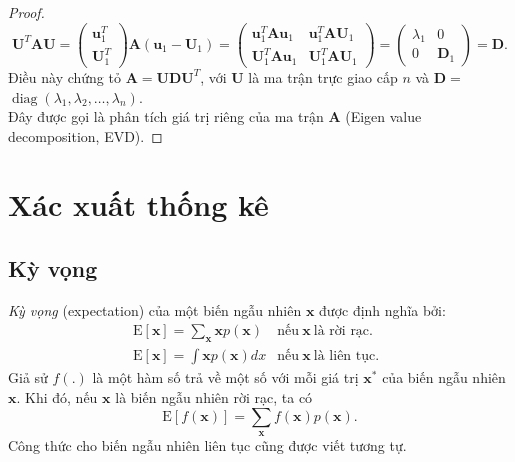 \documentclass[14pt,oneside,a4paper]{report}
\numberwithin{equation}{section}
\begin{document}
\begin{proof}
	$$
	\mathbf{U}^{T} \mathbf{A} \mathbf{U}=\left(\begin{array}{c}
		\mathbf{u}_{1}^{T} \\
		\mathbf{U}_{1}^{T}
	\end{array}\right) \mathbf{A}\left(\mathbf{u}_{1}-\mathbf{U}_{1}\right)=\left(\begin{array}{cc}
		\mathbf{u}_{1}^{T} \mathbf{A} \mathbf{u}_{1} & \mathbf{u}_{1}^{T} \mathbf{A} \mathbf{U}_{1} \\
		\mathbf{U}_{1}^{T} \mathbf{A} \mathbf{u}_{1} & \mathbf{U}_{1}^{T} \mathbf{A} \mathbf{U}_{1}
	\end{array}\right)=\left(\begin{array}{cc}
		\lambda_{1} & 0 \\
		0 & \mathbf{D}_{1}
	\end{array}\right)=\mathbf{D} .
	$$
	Điều này chứng tỏ $\mathbf{A}=\mathbf{U D U}^{T}$, với $\mathbf{U}$ là ma trận trực giao cấp $n$ và $\mathbf{D}=$ $\operatorname{diag}\left(\lambda_{1}, \lambda_{2}, \ldots, \lambda_{n}\right).$\\
	Đây được gọi là phân tích giá trị riêng của ma trận $\mathbf{A}$ (Eigen value decomposition, EVD). 
\end{proof}
\section{Xác xuất thống kê}
\subsection{Kỳ vọng}
\label{sub:expectaion_covariance}
\textit{Kỳ vọng} (expectation) của một biến ngẫu nhiên $\mathbf{x}$ được định nghĩa bởi:
\begin{eqnarray}
	\label{eqn:30_21}
	\text{E}[\mathbf{x}] = \sum_ \mathbf{x} \mathbf{x} p(\mathbf{x})  & \text{nếu}~\mathbf{ x} ~ \text{là rời rạc.} \quad
	\\
	\label{eqn:30_22}
	\text{E}[\mathbf{x}] = \int \mathbf{x} p(\mathbf{x}) dx  & \text{nếu}~ \mathbf{x} ~ \text{là liên tục.}
\end{eqnarray}
Giả sử $f(.)$ là một hàm số trả về một số với mỗi giá trị $\mathbf{x^*}$ của biến ngẫu
nhiên $\mathbf{x}$. Khi đó, nếu $\mathbf{x}$ là biến ngẫu nhiên rời rạc, ta có
\begin{equation}
\label{eqn:30_23}
\text{E}[f(\mathbf{x})] = \sum_\mathbf{x} f(\mathbf{x}) p(\mathbf{x}).
\end{equation}
Công thức cho biến ngẫu nhiên liên tục cũng được viết tương tự.
\end{document}
